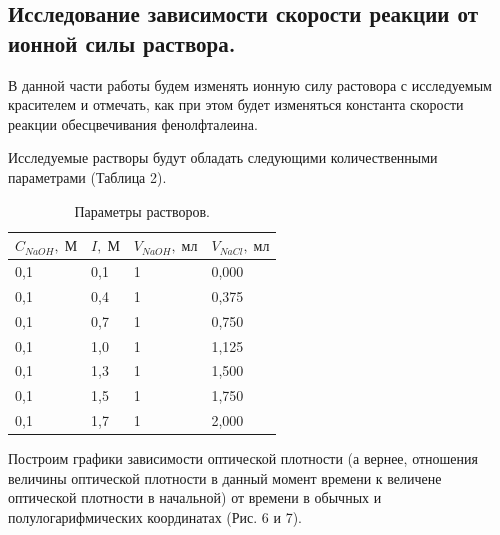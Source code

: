 \documentclass[a4paper, 11pt]{article}%
\begin{document}
\subsection{Исследование зависимости скорости реакции от ионной силы раствора.} \;
\par В данной части работы будем изменять ионную силу растовора с исследуемым красителем и отмечать, как при этом будет изменяться константа скорости реакции обесцвечивания фенолфталеина. 
\par Исследуемые растворы будут обладать следующими количественными параметрами (Таблица 2).
\begin{table}[h!]
\centering
\caption{Параметры растворов.}
\begin{tabular}{|l|l|l|l|}
\hline
$C_{NaOH}, \; \text{М}$ & $I, \; \text{М}$ & $V_{NaOH}, \; \text{мл}$ & $V_{NaCl}, \; \text{мл}$ \\ \hline
0,1 & 0,1 & 1 & 0,000 \\ \hline
0,1 & 0,4 & 1 & 0,375 \\ \hline
0,1 & 0,7 & 1 & 0,750 \\ \hline
0,1 & 1,0 & 1 & 1,125 \\ \hline
0,1 & 1,3 & 1 & 1,500 \\ \hline
0,1 & 1,5 & 1 & 1,750 \\ \hline
0,1 & 1,7 & 1 & 2,000 \\ \hline
\end{tabular}
\end{table}

\par Построим графики зависимости оптической плотности (а вернее, отношения величины оптической плотности в данный момент времени к величене оптической плотности в начальной) от времени в обычных и полулогарифмических координатах (Рис. 6 и 7).
\end{document}
